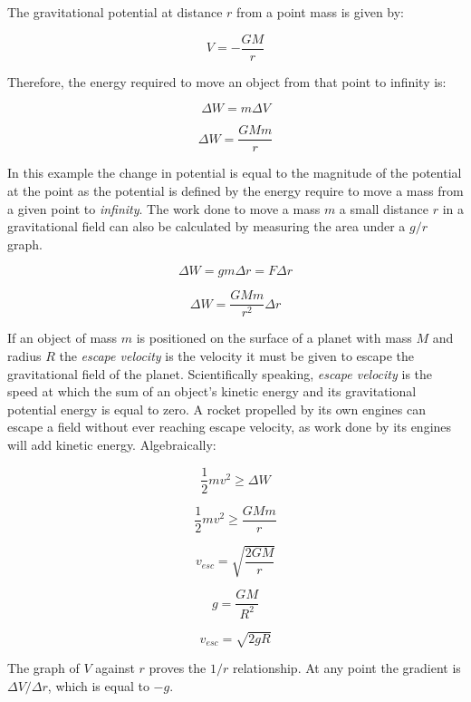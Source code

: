 \documentclass[12pt]{article}
\begin{document}
The gravitational potential at distance \(r\) from a point mass is given by:

\[V = - \dfrac{GM}{r}\]

Therefore, the energy required to move an object from that point to infinity is:

\[\Delta W = m \Delta V\]

\[\Delta W = \dfrac{GMm}{r} \]

In this example the change in potential is equal to the magnitude of the potential at the point as the potential is defined by the energy require to move a mass from a given point to \emph{infinity}. The work done to move a mass \(m\) a small distance \(r\) in a gravitational field can also be calculated by measuring the area under a \(g/r\) graph.

\[\Delta W = gm \Delta r = F \Delta r  \]

\[ \Delta W = \dfrac{GMm}{r^2} \Delta r \]

If an object of mass \(m\) is positioned on the surface of a planet with mass \(M\) and radius \(R\) the \emph{escape velocity} is the velocity it must be given to escape the gravitational field of the planet. Scientifically speaking, \emph{escape velocity} is the speed at which the sum of an object's kinetic energy and its gravitational potential energy is equal to zero. A rocket propelled by its own engines can escape a field without ever reaching escape velocity, as work done by its engines will add kinetic energy. Algebraically:

\[\dfrac{1}{2} m v^2 \ge \Delta W\]

\[\dfrac{1}{2} m v^2 \ge \dfrac{GMm}{r}\]

\[ v_{esc} = \sqrt{\dfrac{2GM}{r}}\]

\[g = \dfrac{GM}{R^2}\]

\[ v_{esc} = \sqrt{2gR}\]


The graph of \(V\) against \(r\) proves the \(1/r\) relationship. At any point the gradient is \(\Delta V / \Delta r\), which is equal to \(-g\).
\end{document}
